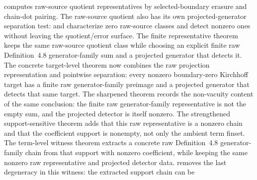 \documentclass[11pt]{article}
\begin{document}
\begin{itemize}
computes raw-source quotient representatives by selected-boundary erasure and
chain-dot pairing.  The raw-source quotient also has its own projected-generator
separation test:
and
characterize zero raw-source classes and detect nonzero ones without leaving
the quotient/error surface.  The finite representative theorem
keeps the same raw-source quotient class while choosing an explicit finite raw
Definition~4.8 generator-family sum and a projected generator that detects it.
The concrete target-level theorem
now combines the raw projection representation and pointwise separation: every
nonzero boundary-zero Kirchhoff target has a finite raw generator-family
preimage and a projected generator that detects that same target.
The sharpened theorem
records the non-vacuity content of the same conclusion: the finite raw
generator-family representative is not the empty sum, and the projected
detector is itself nonzero.
The strengthened support-sensitive theorem
adds that this raw representative is a nonzero chain and that the coefficient
support is nonempty, not only the ambient term finset.
The term-level witness theorem
extracts a concrete raw Definition~4.8 generator-family chain from that support
with nonzero coefficient, while keeping the same nonzero raw representative and
projected detector data.
removes the last degeneracy in this witness: the extracted support chain can be

\end{itemize}
\end{document}
